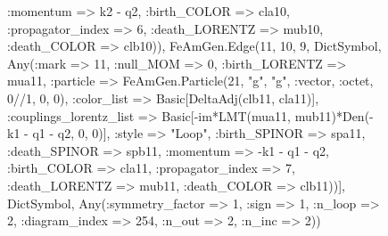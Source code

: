 \documentclass{revtex4}
\begin{document}
\begin{figure}[!htb]
\begin{center}
{:momentum => k2 - q2, :birth_COLOR => cla10, :propagator_index => 6, :death_LORENTZ => mub10, :death_COLOR => clb10)), FeAmGen.Edge(11, 10, 9, Dict{Symbol, Any}(:mark => 11, :null_MOM => 0, :birth_LORENTZ => mua11, :particle => FeAmGen.Particle(21, "g", "g", :vector, :octet, 0//1, 0, 0), :color_list => Basic[DeltaAdj(clb11, cla11)], :couplings_lorentz_list => Basic[-im*LMT(mua11, mub11)*Den(-k1 - q1 - q2, 0, 0)], :style => "Loop", :birth_SPINOR => spa11, :death_SPINOR => spb11, :momentum => -k1 - q1 - q2, :birth_COLOR => cla11, :propagator_index => 7, :death_LORENTZ => mub11, :death_COLOR => clb11))], Dict{Symbol, Any}(:symmetry_factor => 1, :sign => 1, :n_loop => 2, :diagram_index => 254, :n_out => 2, :n_inc => 2)) 
}
\end{center}
\end{figure}
\end{document}
